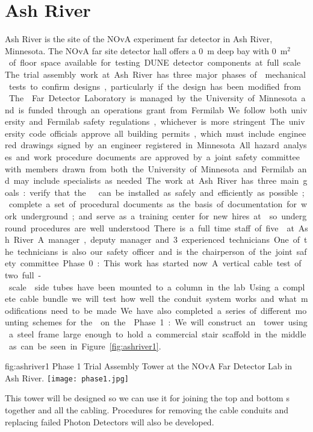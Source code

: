\section{Ash River}

Ash River is the site of the NOvA experiment far detector in Ash
River, Minnesota. The NOvA far site detector hall offers a \SI{0}{m}
deep bay with \SI{0}{m$^2$} of floor space available for testing DUNE
detector components at full scale.  The trial assembly work at Ash
River has three major phases of  mechanical tests to
confirm designs, particularly if the design has been modified from
.  The  Far Detector Laboratory is
managed by the University of Minnesota and is funded through an
operations grant from Fermilab.  We follow both university and
Fermilab safety regulations, whichever is more stringent.  The
university code officials approve all building permits, which must
include engineered drawings signed by an engineer registered in
Minnesota. All hazard analyses and work procedure documents are
approved by a joint safety committee with members drawn from both the
University of Minnesota and Fermilab and may include specialists as
needed.

The work at Ash River has three main goals: verify that the
  can be installed as safely and efficiently as
possible; complete a set of procedural documents as the basis of
documentation for work underground; and serve as a training center for
new hires at \surf so underground procedures are well understood.

There is a full time staff of five  at Ash River. A manager,
deputy manager and 3 experienced technicians.  One of the technicians
is also our safety officer and is the chairperson of the joint safety
committee.


Phase 0: This work has started now.  A vertical cable test of two
full-scale  side tubes have been mounted to a column in the
lab. Using a complete cable bundle we will test how well the conduit
system works and what modifications need to be made. We have also
completed a series of different mounting schemes for the 
on the .

Phase 1: We will construct an  tower using a steel frame large
enough to hold a commercial stair scaffold in the middle as can be
seen in Figure ~\ref{fig:ashriver1}.
\begin{dunefigure}{fig:ashriver1}
  {Phase 1 Trial Assembly  Tower at the NOvA Far Detector Lab in Ash River.}
  \texttt{[image: phase1.jpg]}
\end{dunefigure}
This  tower will be designed so we can
use it for joining the top and bottom s together and all the
cabling. Procedures for removing the cable conduits and replacing
failed Photon Detectors will also be developed.

